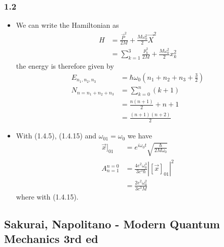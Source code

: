 \documentclass[10pt,a4paper]{article}
\theoremstyle{definition}
\begin{document}
\subsubsection{1.2}
\begin{itemize}
\item We can write the Hamiltonian as
\begin{align}
    H&=\frac{\vec{P}^2}{2M}+\frac{M\omega_0^2}{2}\vec{X}^2\\
    &=\sum_{k=1}^3\frac{p_k^2}{2M}+\frac{M\omega_0^2}{2}x_k^2
\end{align}
the energy is therefore given by
\begin{align}
    E_{n_1,n_2,n_3}&=\hbar\omega_0\left(n_1+n_2+n_3+\frac{3}{2}\right)\\
    N_{n=n_1+n_2+n_3}&=\sum_{k=0}^{n}(k+1)\\
    &=\frac{n(n+1)}{2}+n+1\\
    &=\frac{(n+1)(n+2)}{2}
\end{align}

\item With (1.4.5), (1.4.15) and $\omega_{01}=\omega_0$ we have
\begin{align}
    \vec{x}]_{01}&=e^{i\omega_0 t}\sqrt{\frac{\hbar}{2M\omega_0}}\\
    A_{n=1}^{n=0}&=\frac{4e^2\omega_0^3}{3c^3\hbar}\left|[\vec{x}]_{01}\right|^2\\
    &=\frac{2e^2\omega_0^2}{3c^3M}
\end{align}
where with (1.4.15).
\end{itemize}

\subsection{{\sc Sakurai, Napolitano} - Modern Quantum Mechanics 3rd ed}
\end{document}
